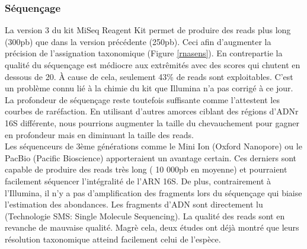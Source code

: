 \documentclass[12pt,a4paper]{article}
\begin{document}
\subsubsection{Séquençage}
La version 3 du kit MiSeq Reagent Kit permet de produire des reads plus long (300pb) que dans la version précédente (250pb). Ceci afin d'augmenter la précision de l'assignation taxonomique (Figure \ref{rnasens}). En contrepartie la qualité du séquençage est médiocre aux extrêmités avec des scores qui chutent en dessous de 20. À cause de cela, seulement 43\% de reads sont exploitables.
C'est un problème connu lié à la chimie du kit que Illumina n'a pas corrigé à ce jour. La profondeur de séquençage reste toutefois suffisante comme l'attestent les courbes de raréfaction. En utilisant d'autres amorces ciblant des régions d'ADNr 16S différente, nous pourrions augmenter la taille du chevauchement pour gagner en profondeur mais en diminuant la taille des reads. \\
Les séquenceurs de 3ème générations comme le Mini Ion (Oxford Nanopore) ou le PacBio (Pacific Bioscience) apporteraient un avantage certain. Ces derniers sont capable de produire des reads très long ( 10 000pb en moyenne) et pourraient facilement séquencer l'intégralité de l'ARN 16S. De plus, contrairement à l'Illumina, il n'y a pas d'amplification des fragments lors du séquençage qui biaise l'estimation des abondances. Les fragments d'ADN sont directement lu (Technologie SMS: Single Molecule Sequencing).
La qualité des reads sont en revanche de mauvaise qualité. Magrè cela, deux études\cite{Wagner2016,Benitez-Paez2016} ont déjà montré que leurs résolution taxonomique atteind facilement celui de l’espèce.
\end{document}
